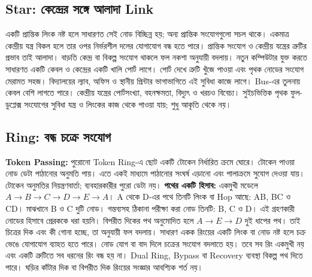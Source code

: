 \subsection{Star: কেন্দ্রের সঙ্গে আলাদা Link}
\label{ch2:c09-03}
একটি প্রান্তিক লিংক নষ্ট হলে সাধারণত সেই নোড বিচ্ছিন্ন হয়; অন্য প্রান্তিক সংযোগগুলো সচল থাকে। একমাত্র কেন্দ্রীয় যন্ত্র বিকল হলে তার ওপর নির্ভরশীল দলের যোগাযোগ বন্ধ হতে পারে। প্রান্তিক সংযোগ ও কেন্দ্রীয় যন্ত্রের ত্রুটির প্রভাব তাই আলাদা। বাড়তি কেন্দ্র বা বিকল্প সংযোগ থাকলে ফল নকশা অনুযায়ী বদলায়।
নতুন কম্পিউটার যুক্ত করতে সাধারণত একটি কেবল ও কেন্দ্রের একটি খালি পোর্ট লাগে। পোর্ট দেখে ত্রুটি খুঁজে পাওয়া এবং পৃথক নোডের সংযোগ মেরামত সহজ। বিদ্যালয়ের ল্যাব, অফিস ও স্থানীয় প্রিন্টার ভাগাভাগিতে এই সুবিধা কাজে লাগে। Bus-এর তুলনায় কেবল বেশি লাগতে পারে। কেন্দ্রীয় যন্ত্রের পোর্টসংখ্যা, বহনক্ষমতা, বিদ্যুৎ ও খরচও বিবেচ্য। সুইচভিত্তিক পৃথক ফুল-ডুপ্লেক্স সংযোগের সুবিধা যন্ত্র ও লিংকের কাজ থেকে পাওয়া যায়; শুধু আকৃতি থেকে নয়।

\subsection{Ring: বন্ধ চক্রে সংযোগ}
\label{ch2:c09-04}
\textbf{Token Passing:} পুরোনো Token Ring-এ ছোট একটি টোকেন নির্ধারিত ক্রমে ঘোরে। টোকেন পাওয়া নোড ডেটা পাঠানোর অনুমতি পায়। এতে একই মাধ্যমে পাঠানোর সংঘর্ষ এড়ানো এবং পালাক্রমে সুযোগ দেওয়া যায়। টোকেন অনুমতির নিয়ন্ত্রণবার্তা; ব্যবহারকারীর পুরো ডেটা নয়।
\textbf{পথের একটি হিসাব:} একমুখী মডেলে $A\to B\to C\to D\to E\to A$। A থেকে D-এর পথে তিনটি লিংক বা Hop আছে: AB, BC ও CD। মাঝখানে B ও C দুটি নোড। গন্তব্যসহ ঠিকানা পরীক্ষা করা নোড তিনটি: B, C ও D। এই গ্রহণকারী নোডের হিসাবে প্রেরককে ধরা হয়নি। বিপরীত দিকের পথ অনুমোদিত হলে $A\to E\to D$ দুই ধাপের পথ। তাই চিত্রের দিক এবং কী গোনা হচ্ছে, তা অনুযায়ী ফল বদলায়।
সাধারণ একক রিংয়ের একটি লিংক বা নোড নষ্ট হলে চক্র ভেঙে যোগাযোগ ব্যাহত হতে পারে। নোড যোগ বা বাদ দিলে চক্রের সংযোগ বদলাতে হয়। তবে সব রিং একমুখী নয় এবং একটি ত্রুটিতে সব ধরনের রিং বন্ধ হয় না। Dual Ring, Bypass বা Recovery ব্যবস্থা বিকল্প পথ দিতে পারে। ঘড়ির কাঁটার দিক বা বিপরীত দিক রিংয়ের সংজ্ঞার আবশ্যিক শর্ত নয়।

